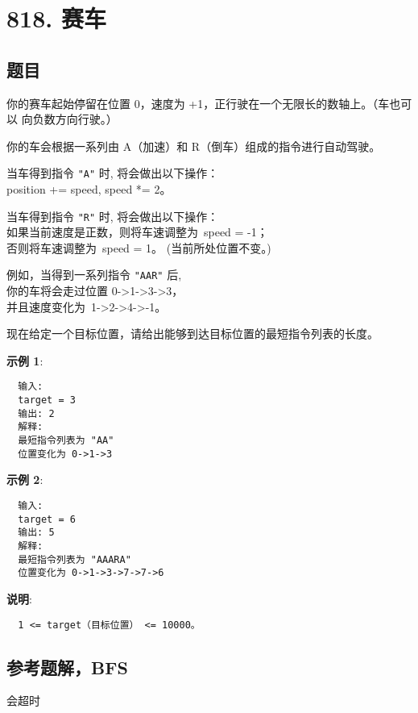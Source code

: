 \newpage
\section{818. 赛车}
\label{leetcode:818}

\subsection{题目}

你的赛车起始停留在位置 0，速度为 +1，正行驶在一个无限长的数轴上。（车也可以
向负数方向行驶。）

你的车会根据一系列由 A（加速）和 R（倒车）组成的指令进行自动驾驶。

当车得到指令 \verb|"A"| 时, 将会做出以下操作： \\
position += speed, speed *= 2。

当车得到指令 \verb|"R"| 时, 将会做出以下操作： \\
如果当前速度是正数，则将车速调整为 speed = -1； \\
否则将车速调整为 speed = 1。 (当前所处位置不变。)

例如，当得到一系列指令 \verb|"AAR"| 后, \\
你的车将会走过位置 0->1->3->3， \\
并且速度变化为 1->2->4->-1。

现在给定一个目标位置，请给出能够到达目标位置的最短指令列表的长度。

\textbf{示例 1}:

\begin{verbatim}
  输入:
  target = 3
  输出: 2
  解释:
  最短指令列表为 "AA"
  位置变化为 0->1->3
\end{verbatim}

\textbf{示例 2}:

\begin{verbatim}
  输入:
  target = 6
  输出: 5
  解释:
  最短指令列表为 "AAARA"
  位置变化为 0->1->3->7->7->6
\end{verbatim}

\textbf{说明}:

\begin{verbatim}
  1 <= target（目标位置） <= 10000。
\end{verbatim}

\subsection{参考题解，BFS}

会超时

